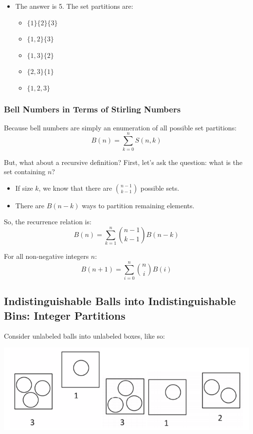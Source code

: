 \documentclass[letterpaper]{article}
\begin{document}
\begin{itemize}
    \item The answer is 5. The set partitions are:
    \begin{itemize}
        \item $\{1\} \{2\} \{3\}$
        \item $\{1, 2\} \{3\}$
        \item $\{1, 3\} \{2\}$
        \item $\{2, 3\} \{1\}$
        \item $\{1, 2, 3\}$
    \end{itemize}
\end{itemize}

\subsubsection{Bell Numbers in Terms of Stirling Numbers}
Because bell numbers are simply an enumeration of all possible set partitions:
\[B(n) = \sum_{k = 0}^n S(n, k)\]

But, what about a recursive definition? First, let's ask the question: what is the set containing $n$?
\begin{itemize}
    \item If size $k$, we know that there are $\binom{n - 1}{k - 1}$ possible sets.
    \item There are $B(n - k)$ ways to partition remaining elements. 
\end{itemize}
So, the recurrence relation is:
\[B(n) = \sum_{k = 1}^n \binom{n - 1}{k - 1}B(n - k)\]

\begin{theorem}{}{}
    For all non-negative integers $n$:
    \[B(n + 1) = \sum_{i = 0}^{n} \binom{n}{i} B(i)\]
\end{theorem}

\subsection{Indistinguishable Balls into Indistinguishable Bins: Integer Partitions}
Consider unlabeled balls into unlabeled boxes, like so:
\begin{center}
    \includegraphics[scale=0.8]{i_ball_i_bin.PNG}
\end{center}
\end{document}
